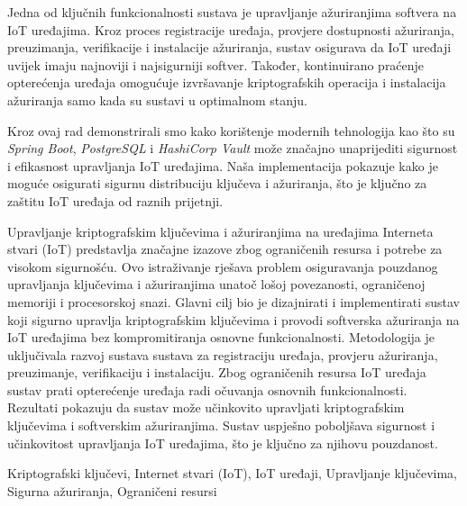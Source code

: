 \documentclass[zavrsnirad]{fer}
\begin{document}
	Jedna od ključnih funkcionalnosti sustava je upravljanje ažuriranjima softvera na IoT uređajima. Kroz proces registracije uređaja, provjere dostupnosti ažuriranja, preuzimanja, verifikacije i instalacije ažuriranja, sustav osigurava da IoT uređaji uvijek imaju najnoviji i najsigurniji softver. Također, kontinuirano praćenje opterećenja uređaja omogućuje izvršavanje kriptografskih operacija i instalacija ažuriranja samo kada su sustavi u optimalnom stanju.
	
	Kroz ovaj rad demonstrirali smo kako korištenje modernih tehnologija kao što su \textit{Spring Boot}, \textit{PostgreSQL} i \textit{HashiCorp Vault} može značajno unaprijediti sigurnost i efikasnost upravljanja IoT uređajima. Naša implementacija pokazuje kako je moguće osigurati sigurnu distribuciju ključeva i ažuriranja, što je ključno za zaštitu IoT uređaja od raznih prijetnji.
	
	
	
	
	\begin{sazetak}
		Upravljanje kriptografskim ključevima i ažuriranjima na uređajima Interneta stvari (IoT) predstavlja značajne izazove zbog ograničenih resursa i potrebe za visokom sigurnošću. Ovo istraživanje rješava problem osiguravanja pouzdanog upravljanja ključevima i ažuriranjima unatoč lošoj povezanosti, ograničenoj memoriji i procesorskoj snazi. Glavni cilj bio je dizajnirati i implementirati sustav koji sigurno upravlja kriptografskim ključevima i provodi softverska ažuriranja na IoT uređajima bez kompromitiranja osnovne funkcionalnosti. Metodologija je uključivala razvoj sustava sustava za registraciju uređaja, provjeru ažuriranja, preuzimanje, verifikaciju i instalaciju. Zbog ograničenih resursa IoT uređaja sustav prati opterećenje uređaja radi očuvanja osnovnih funkcionalnosti. Rezultati pokazuju da sustav može učinkovito upravljati kriptografskim ključevima i softverskim ažuriranjima. Sustav uspješno poboljšava sigurnost i učinkovitost upravljanja IoT uređajima, što je ključno za njihovu pouzdanost.
	\end{sazetak}
	
	\begin{kljucnerijeci}
		Kriptografski ključevi, Internet stvari (IoT), IoT uređaji, Upravljanje ključevima, Sigurna ažuriranja, Ograničeni resursi
	\end{kljucnerijeci}    
	
\end{document}
